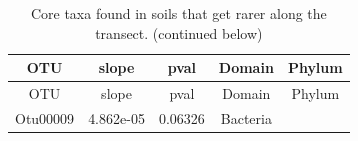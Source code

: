 \documentclass[]{article}
\begin{document}
\begin{longtable}[]{@{}ccccc@{}}
\caption{Core taxa found in soils that get rarer along the transect.
(continued below)}\tabularnewline
\toprule
\begin{minipage}[b]{0.13\columnwidth}\centering\strut
OTU\strut
\end{minipage} & \begin{minipage}[b]{0.14\columnwidth}\centering\strut
slope\strut
\end{minipage} & \begin{minipage}[b]{0.12\columnwidth}\centering\strut
pval\strut
\end{minipage} & \begin{minipage}[b]{0.13\columnwidth}\centering\strut
Domain\strut
\end{minipage} & \begin{minipage}[b]{0.20\columnwidth}\centering\strut
Phylum\strut
\end{minipage}\tabularnewline
\midrule
\endfirsthead
\toprule
\begin{minipage}[b]{0.13\columnwidth}\centering\strut
OTU\strut
\end{minipage} & \begin{minipage}[b]{0.14\columnwidth}\centering\strut
slope\strut
\end{minipage} & \begin{minipage}[b]{0.12\columnwidth}\centering\strut
pval\strut
\end{minipage} & \begin{minipage}[b]{0.13\columnwidth}\centering\strut
Domain\strut
\end{minipage} & \begin{minipage}[b]{0.20\columnwidth}\centering\strut
Phylum\strut
\end{minipage}\tabularnewline
\midrule
\endhead
\begin{minipage}[t]{0.13\columnwidth}\centering\strut
Otu00009\strut
\end{minipage} & \begin{minipage}[t]{0.14\columnwidth}\centering\strut
4.862e-05\strut
\end{minipage} & \begin{minipage}[t]{0.12\columnwidth}\centering\strut
0.06326\strut
\end{minipage} & \begin{minipage}[t]{0.13\columnwidth}\centering\strut
Bacteria\strut
\end{minipage} & \begin{minipage}[t]{0.20\columnwidth}\centering\strut

\end{minipage}
\end{longtable}
\end{document}
